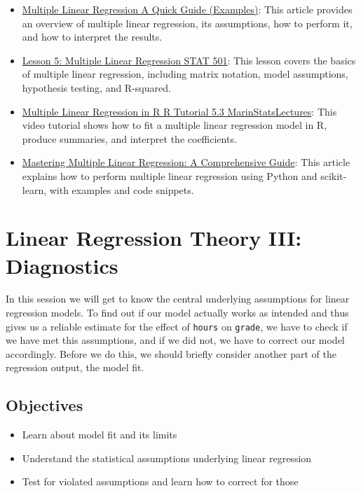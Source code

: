 \documentclass[
]{book}
\providecommand{\tightlist}{%
  \setlength{\itemsep}{0pt}\setlength{\parskip}{0pt}}
\begin{document}
\begin{itemize}
\tightlist
\item
  \href{https://www.scribbr.com/statistics/multiple-linear-regression/}{Multiple Linear Regression \textbar{} A Quick Guide (Examples)}: This article provides an overview of multiple linear regression, its assumptions, how to perform it, and how to interpret the results.
\item
  \href{https://online.stat.psu.edu/stat501/lesson/5}{Lesson 5: Multiple Linear Regression \textbar{} STAT 501}: This lesson covers the basics of multiple linear regression, including matrix notation, model assumptions, hypothesis testing, and R-squared.
\item
  \href{https://www.youtube.com/watch?v=q1RD5ECsSB0}{Multiple Linear Regression in R \textbar{} R Tutorial 5.3 \textbar{} MarinStatsLectures}: This video tutorial shows how to fit a multiple linear regression model in R, produce summaries, and interpret the coefficients.
\item
  \href{https://www.analyticsvidhya.com/blog/2021/05/multiple-linear-regression-using-python-and-scikit-learn/}{Mastering Multiple Linear Regression: A Comprehensive Guide}: This article explains how to perform multiple linear regression using Python and scikit-learn, with examples and code snippets.
\end{itemize}

\hypertarget{lin-t-3}{%
\chapter{Linear Regression Theory III: Diagnostics}\label{lin-t-3}}

In this session we will get to know the central underlying assumptions for linear
regression models. To find out if our model actually works as intended and thus
gives us a reliable estimate for the effect of \texttt{hours} on \texttt{grade}, we have to
check if we have met this assumptions, and if we did not, we have to correct our
model accordingly. Before we do this, we should briefly consider another part
of the regression output, the model fit.

\hypertarget{objectives-4}{%
\section{Objectives}\label{objectives-4}}

\begin{itemize}
\tightlist
\item
  Learn about model fit and its limits
\item
  Understand the statistical assumptions underlying linear regression
\item
  Test for violated assumptions and learn how to correct for those
\end{itemize}
\end{document}
